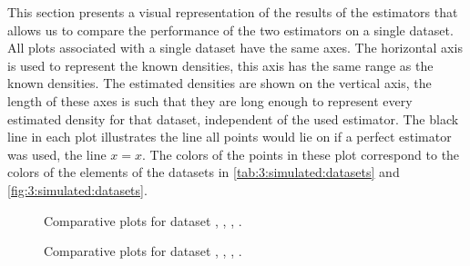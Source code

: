 This section presents a visual representation of the results of the estimators that allows us to compare the performance of the two estimators on a single dataset. All plots associated with a single dataset have the same axes. The horizontal axis is used to represent the known densities, this axis has the same range as the known densities. The estimated densities are shown on the vertical axis, the length of these axes is such that they are long enough to represent every estimated density for that dataset, independent of the used estimator. The black line in each plot illustrates the line all points would lie on if a perfect estimator was used, \ie the line $x = x$. The colors of the points in these plot correspond to the colors of the elements of the datasets in \cref{tab:3:simulated:datasets} and \cref{fig:3:simulated:datasets}.

\begin{figure*}
	\centering
	
	\caption{Comparative plots for dataset \ferdosiOne, \baakmanOne, \baakmanFour, \baakmanFive.}
	\label{fig:4:results:singleSphere}
\end{figure*}







\begin{figure*}
	\centering
	
	\caption{Comparative plots for dataset \ferdosiTwo, \ferdosiThree, \baakmanTwo, \baakmanThree.}
	\label{fig:4:resuts:multiSphere}
\end{figure*}

